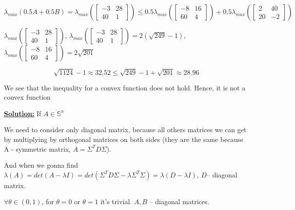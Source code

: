 \begin{equation*}
    \lambda_{max}(0.5 A + 0.5B) = \lambda_{max} \left( \begin{bmatrix}
        -3 & 28 \\
        40 & 1
    \end{bmatrix} \right) \leq 0.5 \lambda_{max}\left(\begin{bmatrix}
    -8 & 16 \\
    60 & 4 
\end{bmatrix} \right) + 0.5 \lambda_{max}\left( \begin{bmatrix}
    2 & 40 \\
    20 & -2
\end{bmatrix}\right)
\end{equation*}

$ \lambda_{max} \left( \begin{bmatrix}
        -3 & 28 \\
        40 & 1
    \end{bmatrix} \right)$, $\lambda_{max}\left( \begin{bmatrix}
        -3 & 28 \\
        40 & 1
    \end{bmatrix} \right) = 2(\sqrt{249} - 1)$, $\lambda_{max} \left(\begin{bmatrix}
    -8 & 16 \\
    60 & 4 
\end{bmatrix} \right) = 2\sqrt{201}$

\begin{equation*}
    \sqrt{1124} - 1 \approx 32.52 \leq \sqrt{249} - 1 + \sqrt{201} \approx 28.96
\end{equation*}

We see that the inequality for a convex function does not hold. Hence, it is not a convex function

\underline{\textbf{Solution:}}
If $A \in \mathds{S}^n$

We need to consider only diagonal matrix, because all others matrices we can get by multiplying by orthogonal matrices on both sides (they are the same because A - symmetric matrix, $A = \Sigma^T D \Sigma$).

And when we gonna find $\lambda(A) = det(A - \lambda I) = det(\Sigma^T D \Sigma - \lambda \Sigma^T \Sigma)  = \lambda(D - \lambda I)$, $D $-- diagonal matrix.

$\forall \theta \in (0, 1)$, for $\theta = 0$ or $\theta = 1$ it's trivial. $A, B$ -- diagonal matrices. 

